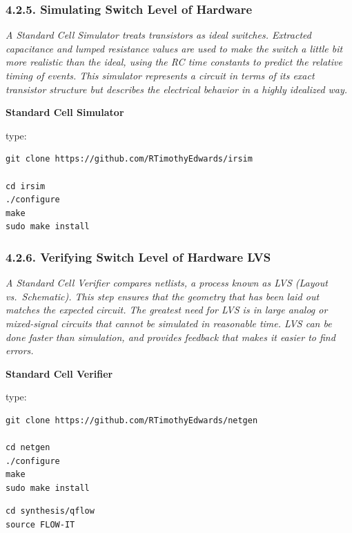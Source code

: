 \documentclass[
]{article}
\begin{document}
\hypertarget{simulating-switch-level-of-hardware-1}{%
\subsubsection{4.2.5. Simulating Switch Level of
Hardware}\label{simulating-switch-level-of-hardware-1}}

\emph{A Standard Cell Simulator treats transistors as ideal switches.
Extracted capacitance and lumped resistance values are used to make the
switch a little bit more realistic than the ideal, using the RC time
constants to predict the relative timing of events. This simulator
represents a circuit in terms of its exact transistor structure but
describes the electrical behavior in a highly idealized way.}

\textbf{Standard Cell Simulator}

type:

\begin{verbatim}
git clone https://github.com/RTimothyEdwards/irsim

cd irsim
./configure
make
sudo make install
\end{verbatim}

\hypertarget{verifying-switch-level-of-hardware-lvs-1}{%
\subsubsection{4.2.6. Verifying Switch Level of Hardware
LVS}\label{verifying-switch-level-of-hardware-lvs-1}}

\emph{A Standard Cell Verifier compares netlists, a process known as LVS
(Layout vs.~Schematic). This step ensures that the geometry that has
been laid out matches the expected circuit. The greatest need for LVS is
in large analog or mixed-signal circuits that cannot be simulated in
reasonable time. LVS can be done faster than simulation, and provides
feedback that makes it easier to find errors.}

\textbf{Standard Cell Verifier}

type:

\begin{verbatim}
git clone https://github.com/RTimothyEdwards/netgen

cd netgen
./configure
make
sudo make install
\end{verbatim}

\begin{verbatim}
cd synthesis/qflow
source FLOW-IT
\end{verbatim}
\end{document}
